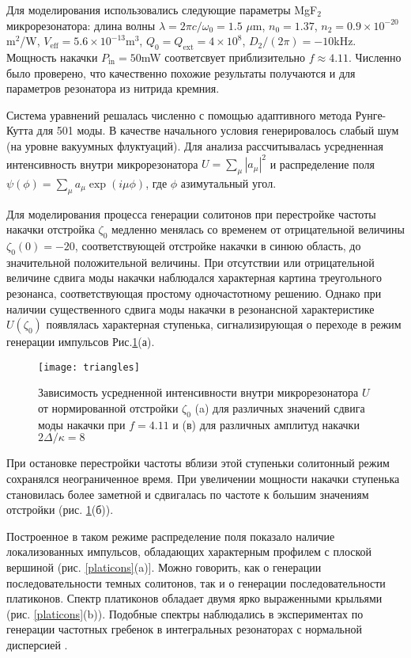 Для моделирования использовались следующие параметры MgF$_2$ микрорезонатора: длина волны $\lambda=2\pi c/\omega_0=1.5$ $\mu$m, $n_0=1.37$, $n_2=0.9\times 10^{-20}$ m$^2$/W, $V_{\mathrm{eff}}=5.6\times 10^{-13}$m$^3$,  $Q_0=Q_\text{ext}=4\times 10^8$, $D_2/(2\pi)=-10$kHz. Мощность накачки $P_\mathrm{in}=50$mW соответсвует приблизительно $f\approx 4.11$. Численно было проверено, что качественно похожие результаты получаются и для параметров резонатора из нитрида кремния\cite{Brasch2016}.

Система уравнений решалась численно с помощью адаптивного метода Рунге-Кутта для 501 моды. В качестве начального условия генерировалось слабый шум (на уровне вакуумных флуктуаций). Для анализа рассчитывалась усредненная интенсивность внутри микрорезонатора $U=\sum_\mu |a_\mu|^2$ и распределение поля $\psi(\phi)=\sum_\mu a_\mu \exp(i\mu\phi)$, где $\phi$ азимутальный угол.

Для моделирования процесса генерации солитонов при перестройке частоты накачки отстройка $\zeta_0$ медленно менялась со временем от отрицательной величины $\zeta_0(0)=-20$, соответствующей отстройке накачки в синюю область, до значительной положительной величины.  При отсутствии или отрицательной величине сдвига моды накачки наблюдался характерная картина треугольного резонанса, соответствующая простому одночастотному решению. Однако при наличии существенного сдвига моды накачки в резонансной характеристике $U(\zeta_0)$ появлялась характерная ступенька, сигнализирующая о переходе в режим генерации импульсов Рис.\ref{platicon_triangles}(а).

\begin{figure}
  \centering
  \texttt{[image: triangles]}
  \caption{Зависимость усредненной интенсивности внутри микрорезонатора $U$ от нормированной отстройки $\zeta_0$ (a) для различных значений сдвига моды накачки при $f=4.11$ и (в) для различных амплитуд накачки $2\Delta/\kappa=8$} \label{platicon_triangles}
\end{figure}

При остановке перестройки частоты вблизи этой ступеньки солитонный режим сохранялся неограниченное время.
При увеличении мощности накачки ступенька становилась более заметной и сдвигалась по частоте к большим значениям отстройки (рис. \ref{platicon_triangles}(б)).

Построенное в таком режиме распределение поля показало наличие локализованных импульсов, обладающих характерным профилем с плоской вершиной (рис. \ref{platicons}(a)]. Можно говорить, как о генерации последовательности темных солитонов, так и о генерации последовательности платиконов. Спектр платиконов обладает двумя ярко выраженными крыльями (рис. \ref{platicons}(b)). Подобные спектры наблюдались в экспериментах по генерации частотных гребенок в интегральных резонаторах с нормальной дисперсией \cite{Huang2015prl}.

